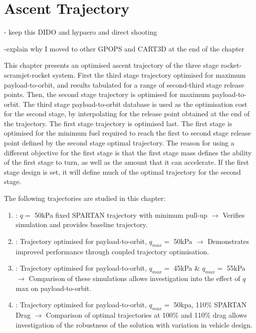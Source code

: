 
\cleardoublepage
\chapter{Ascent Trajectory}\label{chapter:numerical}


- keep this DIDO and hypaero and direct shooting

-explain why I moved to other GPOPS and CART3D at the end of the chapter


This chapter presents an optimised ascent trajectory of the three stage rocket-scramjet-rocket system. First the third stage trajectory optimised for maximum payload-to-orbit, and results tabulated for a range of second-third stage release points. Then, the second stage trajectory is optimised for maximum payload-to-orbit. The third stage payload-to-orbit database is used as the optimisation cost for the second stage, by interpolating for the release point obtained at the end of the trajectory. The first stage trajectory is optimised last. The first stage is optimised for the minimum fuel required to reach the first to second stage release point defined by the second stage optimal trajectory. The reason for using a different objective for the first stage is that the first stage mass defines the ability of the first stage to turn, as well as the amount that it can accelerate. If the first stage design is set, it will define much of the optimal trajectory for the second stage. 

The following trajectories are studied in this chapter: 
\begin{enumerate}
	\item: $q = $ 50kPa fixed SPARTAN trajectory with minimum pull-up \newline$\rightarrow$ Verifies simulation and provides baseline trajectory.
	\item: Trajectory optimised for payload-to-orbit, $q_{max} = $ 50kPa \newline$\rightarrow$ Demonstrates improved performance through coupled trajectory optimisation.
	\item: Trajectory optimised for payload-to-orbit, $q_{max} = $ 45kPa \& $q_{max} = $ 55kPa \newline$\rightarrow$ Comparison of these simulations allows investigation into the effect of $q$ max on payload-to-orbit.
	\item: Trajectory optimised for payload-to-orbit,  $q_{max} = $ 50kpa, 110\% SPARTAN Drag \newline$\rightarrow$ Comparison of optimal trajectories at 100\% and 110\% drag allows investigation of the robustness of the solution with variation in vehicle design. 
\end{enumerate}





